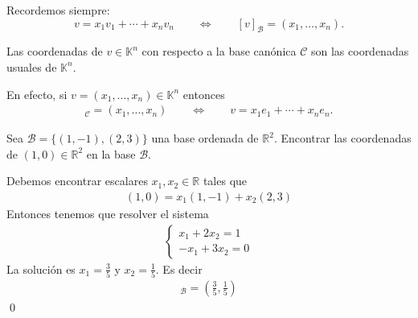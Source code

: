 \documentclass[handout]{beamer} %
\newcommand{\R}{\mathbb R}
\newcommand{\K}{\mathbb K}
\newcommand{\cC}{\mathcal{C}}
\newcommand{\cB}{\mathcal{B}}
\begin{document}
        \begin{frame}
            
        \begin{observacion}
        Recordemos siempre:
        $$
        v =   x_1v_1 + \cdots +x_nv_n \qquad \Longleftrightarrow \qquad 
        [v]_\mathcal{B} = (x_1,\ldots,x_n).
        $$
        \end{observacion}\pause
    
        \begin{ejemplo}
        Las coordenadas de $v\in\K^n$ con respecto a la base canónica $\cC$ son las coordenadas usuales de $\K^n$. 
        \end{ejemplo}\pause
        
        En efecto, si $v=(x_1, ..., x_n)\in\K^n$ entonces
        \begin{align*}
        [v]_\cC=(x_1, ..., x_n) \qquad \Longleftrightarrow \qquad v= x_1e_1+\cdots+x_ne_n.
        \end{align*}
        
    
        
        \end{frame}
        
        \begin{frame}
        
    
        \begin{ejemplo} 
            \vskip -0.2cm Sea $\cB=\{(1,-1), (2,3)\}$  una base ordenada de $\R^2$.
        Encontrar las coordenadas de $(1,0)\in\R^2$ en la base $\cB$.
        \end{ejemplo}\pause
        \vskip -0.4cm
        \begin{solucion}\pause
            Debemos encontrar escalares $x_1,x_2\in\R$ tales que
        \begin{align*}
        (1,0)=x_1(1,-1)+x_2(2,3) 
        \end{align*}
        Entonces tenemos que resolver el sistema
        \begin{align*}
        \begin{cases}
        x_1+2x_2=1\\ 
        -x_1+3x_2=0
        \end{cases} 
        \end{align*}
        La solución es $x_1=\frac{3}{5}$ y $x_2=\frac{1}{5}$. Es decir
        \begin{align*}
        [(1,0)]_{\cB}=\left(\frac{3}{5},\frac{1}{5}\right) 
        \end{align*}	\qed
        \end{solucion}
    \end{frame}
    
\end{document}
